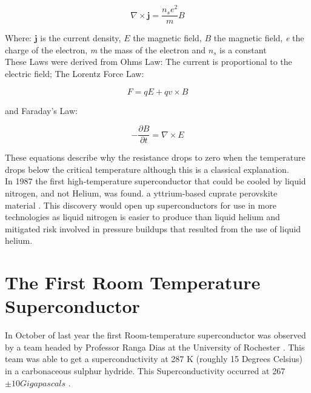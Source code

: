 \documentclass[12pt]{article}
\begin{document}
\begin{equation}
 \nabla \times \textbf{j} = \frac{n_{s}e^2}{m}B   
\end{equation} 

Where: $\mathbf{j}$ is the current density, $E$ the magnetic field, $B$ the magnetic field, \textit{e} the charge of the electron, \textit{m} the mass of the electron and $n_{s}$ is a constant \cite{London Equations}\\

These Laws were derived from Ohms Law: The current is proportional to the electric field; The Lorentz Force Law: 

\begin{equation}
F = qE + qv \times B
\end{equation}

and Faraday's Law:

\begin{equation}
-\frac{\partial B}{\partial t} = \nabla \times E
\end{equation}

These equations describe why the resistance drops to zero when the temperature drops below the critical temperature although this is a classical explanation.  
\\
In 1987 the first high-temperature superconductor that could be cooled by liquid nitrogen, and not Helium, was found. a yttrium-based cuprate perovskite material \cite{93 K Superconductor}. This discovery would open up superconductors for use in more technologies as liquid nitrogen is easier to produce than liquid helium and mitigated risk involved in pressure buildups that resulted from the use of liquid helium. \\
 

\section{The First Room Temperature Superconductor}
\label{sec:PDU}
In October of last year the first Room-temperature superconductor was observed by a team headed by Professor Ranga Dias at the University of Rochester \cite{NYT}. This team was able to get a superconductivity at 287 K (roughly 15 Degrees Celsius) in a carbonaceous sulphur hydride. This Superconductivity occurred at 267$ \pm {10} Gigapascals$ \cite{Room-Temperature Superconductivity}.
\\
\end{document}
